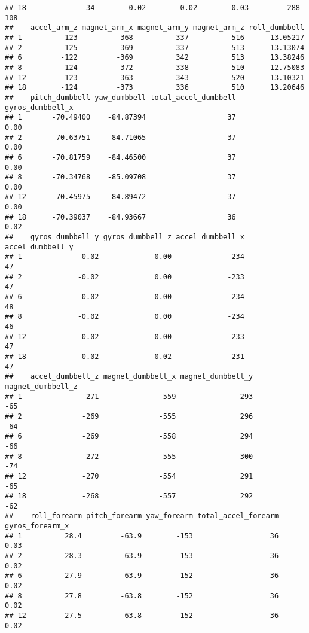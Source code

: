 \documentclass[]{article}
\begin{document}
\begin{verbatim}
## 18              34        0.02       -0.02       -0.03        -288         108
##    accel_arm_z magnet_arm_x magnet_arm_y magnet_arm_z roll_dumbbell
## 1         -123         -368          337          516      13.05217
## 2         -125         -369          337          513      13.13074
## 6         -122         -369          342          513      13.38246
## 8         -124         -372          338          510      12.75083
## 12        -123         -363          343          520      13.10321
## 18        -124         -373          336          510      13.20646
##    pitch_dumbbell yaw_dumbbell total_accel_dumbbell gyros_dumbbell_x
## 1       -70.49400    -84.87394                   37             0.00
## 2       -70.63751    -84.71065                   37             0.00
## 6       -70.81759    -84.46500                   37             0.00
## 8       -70.34768    -85.09708                   37             0.00
## 12      -70.45975    -84.89472                   37             0.00
## 18      -70.39037    -84.93667                   36             0.02
##    gyros_dumbbell_y gyros_dumbbell_z accel_dumbbell_x accel_dumbbell_y
## 1             -0.02             0.00             -234               47
## 2             -0.02             0.00             -233               47
## 6             -0.02             0.00             -234               48
## 8             -0.02             0.00             -234               46
## 12            -0.02             0.00             -233               47
## 18            -0.02            -0.02             -231               47
##    accel_dumbbell_z magnet_dumbbell_x magnet_dumbbell_y magnet_dumbbell_z
## 1              -271              -559               293               -65
## 2              -269              -555               296               -64
## 6              -269              -558               294               -66
## 8              -272              -555               300               -74
## 12             -270              -554               291               -65
## 18             -268              -557               292               -62
##    roll_forearm pitch_forearm yaw_forearm total_accel_forearm gyros_forearm_x
## 1          28.4         -63.9        -153                  36            0.03
## 2          28.3         -63.9        -153                  36            0.02
## 6          27.9         -63.9        -152                  36            0.02
## 8          27.8         -63.8        -152                  36            0.02
## 12         27.5         -63.8        -152                  36            0.02

\end{verbatim}
\end{document}
